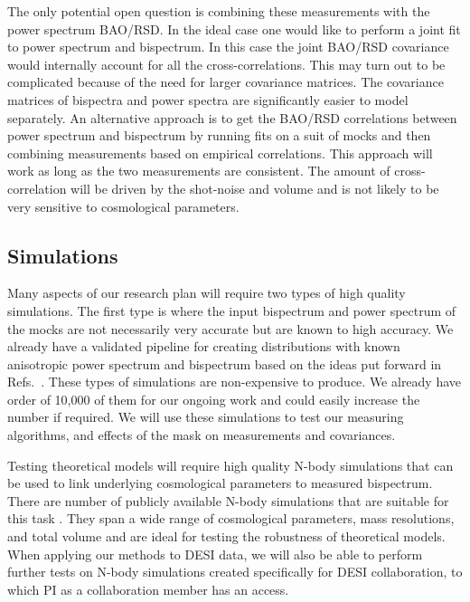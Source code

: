 The only potential open question is combining these measurements with the power
spectrum BAO/RSD. In the ideal case one would like to perform a joint fit to
power spectrum and bispectrum. In this case the joint BAO/RSD covariance would
internally account for all the cross-correlations. This may turn out to be
complicated because of the need for larger covariance matrices. The covariance
matrices of bispectra and power spectra are significantly easier to model separately.
An alternative approach is to get the BAO/RSD correlations between power
spectrum and bispectrum by running fits on a suit of mocks and then combining
measurements based on empirical correlations. This approach will work as long
as the two measurements are consistent. The amount of cross-correlation will
be driven by the shot-noise and volume and is not likely to be very sensitive
to cosmological parameters.

\subsection*{Simulations}

Many aspects of our research plan will require two types of high quality
simulations. The first type is where the input bispectrum and power spectrum of
the mocks are not necessarily very accurate but are known to high accuracy. We
already have a validated pipeline for creating distributions with known
anisotropic power spectrum and bispectrum based on the ideas put forward in
Refs.~\cite{2012PhRvD..85h3002S,2012PhRvD..86l3524R,2010JCAP...10..022W}. These
types of simulations are non-expensive to produce. We already have order of
10,000 of them for our ongoing work and could easily increase the number if
required. We will use these simulations to test our measuring algorithms, and
effects of the mask on measurements and covariances. 

Testing theoretical models will require high quality N-body simulations that
can be used to link underlying cosmological parameters to measured bispectrum.
There are number of publicly available N-body simulations that are suitable for
this task
\cite{2017arXiv171101453K,2005Natur.435..629S,2013AN....334..691R,2016MNRAS.457.4340K,2015JKAS...48..213K,2011JKAS...44..217K,2014arXiv1407.2600S}.
They span a wide range of cosmological parameters, mass resolutions, and total
volume and are ideal for testing the robustness of theoretical models. When
applying our methods to DESI data, we will also be able to perform further
tests on N-body simulations created specifically for DESI collaboration, to
which PI as a collaboration member has an access.


